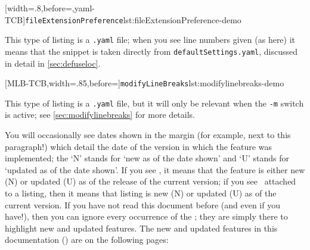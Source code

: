	\begin{minipage}{.4\textwidth}
		[width=.8\linewidth,before=\centering,yaml-TCB]{\texttt{fileExtensionPreference}}{lst:fileExtensionPreference-demo}
	\end{minipage}%
	\hfill
	\begin{minipage}{.4\textwidth}
		This type of listing is a \texttt{.yaml} file; when you see line numbers given (as here)
		it means that the snippet is taken directly from \texttt{defaultSettings.yaml}, discussed in
		detail in \vref{sec:defuseloc}.
	\end{minipage}%

	\begin{minipage}{.55\textwidth}
		[MLB-TCB,width=.85\linewidth,before=\centering]{\texttt{modifyLineBreaks}}{lst:modifylinebreaks-demo}
	\end{minipage}%
	\hfill
	\begin{minipage}{.4\textwidth}
		This type of listing is a \texttt{.yaml} file, but it will only
		be relevant when the \texttt{-m} switch is active; see \vref{sec:modifylinebreaks}
		for more details.
	\end{minipage}%

	You will occasionally see dates shown in the margin (for example, next to this paragraph!)
	 which detail the date of the version in which the feature was implemented;
	the `N' stands for `new as of the date shown' and `U' stands for `updated as of the date shown'.
	If you see \stardemo, it
	means that the feature is either new (N) or updated (U) as of the release of the current version; if you see \stardemo\,
	attached to a listing, then it means that listing is new (N) or updated (U) as of the current version. If you have
	not read this document before (and even if you have!), then you can ignore every occurrence of the \stardemo;
	they are simply there to highlight new and updated features.
	The new and updated features in this documentation (\gitRel) are on the following pages: \listOfNewFeatures

